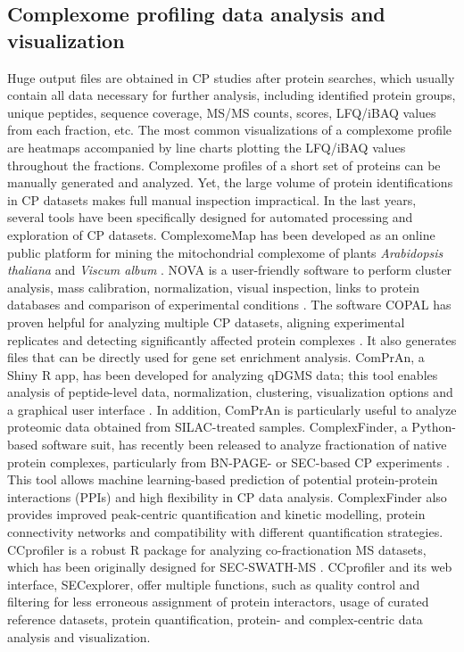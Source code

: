 \subsection{Complexome profiling data analysis and visualization} \label{ssec:CP_MS_ssec2}
Huge output files are obtained in CP studies after protein searches, which usually contain all data necessary for further analysis, including identified protein groups, unique peptides, sequence coverage, MS/MS counts, scores, LFQ/iBAQ values from each fraction, etc. The most common visualizations of a complexome profile are heatmaps accompanied by line charts plotting the LFQ/iBAQ values throughout the fractions. Complexome profiles of a short set of proteins can be manually generated and analyzed. Yet, the large volume of protein identifications in CP datasets makes full manual inspection impractical. In the last years, several tools have been specifically designed for automated processing and exploration of CP datasets. 
ComplexomeMap has been developed as an online public platform for mining the mitochondrial complexome of plants \emph{Arabidopsis thaliana} and \emph{Viscum album} \cite{Senkler_2017}. NOVA is a user-friendly software to perform cluster analysis, mass calibration, normalization, visual inspection, links to protein databases and comparison of experimental conditions \cite{Giese_2015}. The software COPAL has proven helpful for analyzing multiple CP datasets, aligning experimental replicates and detecting significantly affected protein complexes \cite{Van_Strien_2019}. It also generates files that can be directly used for gene set enrichment analysis. ComPrAn, a Shiny R app, has been developed for analyzing qDGMS data; this tool enables analysis of peptide-level data, normalization, clustering, visualization options and a graphical user interface \cite{Palenikova_2021a}. In addition, ComPrAn is particularly useful to analyze proteomic data obtained from SILAC-treated samples. ComplexFinder, a Python-based software suit, has recently been released to analyze fractionation of native protein complexes, particularly from BN-PAGE- or SEC-based CP experiments \cite{Nolte_2021}. This tool allows machine learning-based prediction of potential protein-protein interactions (PPIs) and high flexibility in CP data analysis. ComplexFinder also provides improved peak-centric quantification and kinetic modelling, protein connectivity networks and compatibility with different quantification strategies. CCprofiler is a robust R package for analyzing co-fractionation MS datasets, which has been originally designed for SEC-SWATH-MS \cite{Heusel_2019}. CCprofiler and its web interface, SECexplorer, offer multiple functions, such as quality control and filtering for less erroneous assignment of protein interactors, usage of curated reference datasets, protein quantification, protein- and complex-centric data analysis and visualization. 
